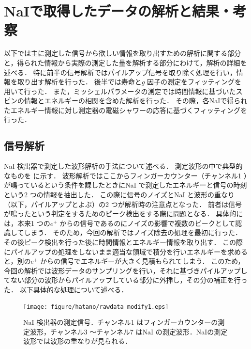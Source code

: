 
%
\section{NaIで取得したデータの解析と結果・考察}
以下では主に測定した信号から欲しい情報を取り出すための解析に関する部分と，得られた情報から実際の測定した量を解析する部分にわけて，解析の詳細を述べる．
特に前半の信号解析ではパイルアップ信号を取り除く処理を行い，情報を取り出す解析を行った．
後半では寿命と$g$ 因子の測定をフィッティングを用いて行った．
また，ミッシェルパラメータの測定では時間情報に基づいたスピンの情報とエネルギーの相関を含めた解析を行った．
その際，各NaIで得られたエネルギー情報に対し測定器の電磁シャワーの応答に基づくフィッティングを行った．

\subsection{信号解析}
NaI 検出器で測定した波形解析の手法について述べる．
測定波形の中で典型的なものを に示す．
波形解析ではここからフィンガーカウンター（チャンネル1 ）が鳴っているという条件を課したときにNaI で測定したエネルギーと信号の時刻という2 つの情報を抽出した．
この際に信号のノイズとNaI と波形の重なり（以下，パイルアップとよぶ）の2 つが解析時の注意点となった．
前者は信号が鳴ったという判定をするためのピーク検出をする際に問題となる．
具体的には，本来1 つの$e^+$ からの信号であるのにノイズの影響で複数のピークとして認識してしまう．
そのため，今回の解析ではノイズ除去の処理を最初に行った．
その後ピーク検出を行った後に時間情報とエネルギー情報を取り出す．
この際にパイルアップの処理をしないまま適当な領域で積分を行いエネルギーを求めると，別の$e^+$ からの信号でエネルギーが大きく見積もられてしまう．
このため，今回の解析では波形データのサンプリングを行い，それに基づきパイルアップしてない部分の波形からパイルアップしている部分に外挿し，その分の補正を行った．
以下具体的な処理について述べる．

\begin{figure}[hbt]
\centering
\texttt{[image: figure/hatano/rawdata\_modify1.eps]}
\caption{NaI 検出器の測定信号．チャンネル1 はフィンガーカウンターの測定波形，チャンネル3 〜チャンネル7 はNaI の測定波形．NaIの測定波形では波形の重なりが見られる．}
\label{hatano_fig:rawdata}
\end{figure}


